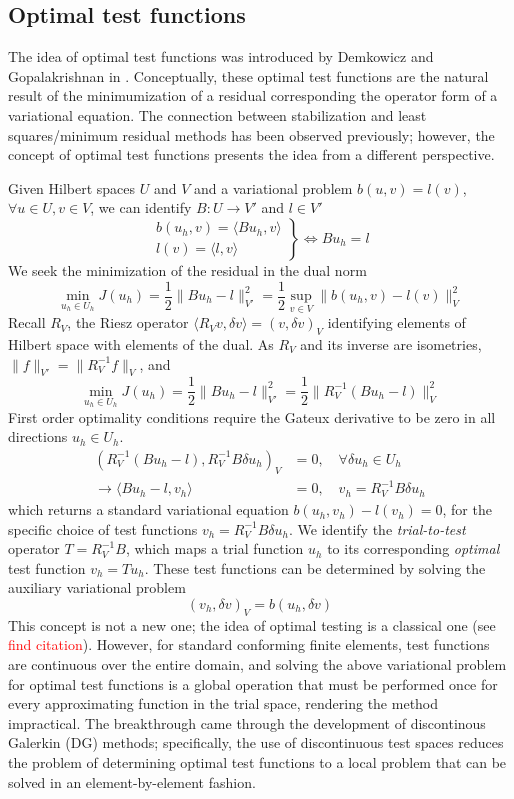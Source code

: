 \documentclass[11pt,onecolumn]{scrartcl}
\begin{document}

\subsection{Optimal test functions}
The idea of optimal test functions was introduced by Demkowicz and Gopalakrishnan in \cite{DPG2}.  Conceptually, these optimal test functions are the natural result of the minimumization of a residual corresponding the operator form of a variational equation. The connection between stabilization and least squares/minimum residual methods has been observed previously; however, the concept of optimal test functions presents the idea from a different perspective.

Given Hilbert spaces $U$ and $V$ and a variational problem $b(u,v) = l(v)$, $\forall u\in U, v\in V$, we can identify $B:U\rightarrow V'$ and $l \in V'$ 
\[
\left.\begin{array}{c}
b(u_h,v) = \langle Bu_h,v\rangle  \\
l(v) = \langle l,v\rangle
\end{array}\right\}
\Longleftrightarrow Bu_h = l
\]
We seek the minimization of the residual in the dual norm
\[
\min_{u_h\in U_h} J(u_h) = \frac{1}{2}\|Bu_h-l\|_{V'}^2 = \frac{1}{2} \sup_{v\in V} \| b(u_h,v)-l(v)\|_{V}^2
\]
Recall $R_V$, the Riesz operator $\langle R_V v,\delta v\rangle = (v, \delta v)_V$ identifying elements of Hilbert space with elements of the dual.  As $R_V$ and its inverse are isometries, $\|f\|_{V'} = \|R_V^{-1} f\|_V$, and 
\[
\min_{u_h\in U_h} J(u_h) = \frac{1}{2}\|Bu_h-l\|_{V'}^2 =  \frac{1}{2}\|R_V^{-1}(Bu_h-l)\|_V^2
\]
First order optimality conditions require the Gateux derivative to be zero in all directions $u_h \in U_h$.  
\begin{align*}
\left(R_V^{-1}(Bu_h-l),R_V^{-1}B\delta u_h\right)_V &= 0, \quad \forall \delta u_h \in U_h \\
\rightarrow \langle Bu_h-l, v_h\rangle &= 0, \quad v_h = R_V^{-1}B\delta u_h
\end{align*}
which returns a standard variational equation $b(u_h,v_h) - l(v_h) = 0$, for the specific choice of test functions $v_h = R_V^{-1}B\delta u_h$.  We identify the \textit{trial-to-test} operator $T = R_V^{-1}B$, which maps a trial function $u_h$ to its corresponding \textit{optimal} test function $v_h = Tu_h$.  These test functions can be determined by solving the auxiliary variational problem
\[
\left(v_h,\delta v\right)_V = b(u_h,\delta v)
\]
This concept is not a new one; the idea of optimal testing is a classical one (see \textcolor{red}{find citation}).  However, for standard conforming finite elements, test functions are continuous over the entire domain, and solving the above variational problem for optimal test functions is a global operation that must be performed once for every approximating function in the trial space, rendering the method impractical. The breakthrough came through the development of discontinous Galerkin (DG) methods; specifically, the use of discontinuous test spaces reduces the problem of determining optimal test functions to a local problem that can be solved in an element-by-element fashion.  
\end{document}
